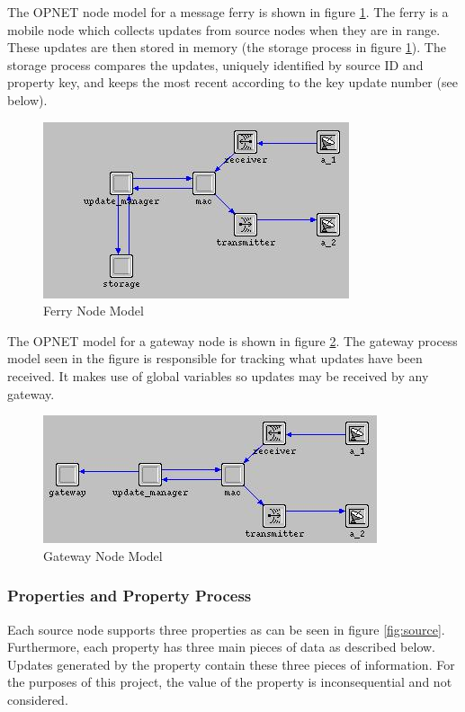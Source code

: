 The OPNET node model for a message ferry is shown in figure \ref{fig:Ferry}.
The ferry is a mobile node which collects updates from source nodes when they are in range. 
These updates are then stored in memory (the storage process in figure \ref{fig:Ferry}). 
The storage process compares the updates, uniquely identified by source ID and property key, and keeps the most recent according to the key update number (see below).

\begin{figure}[h]
    \centering
    \includegraphics[width=.7\textwidth]{images/ferry.jpg}
    \caption{Ferry Node Model}
    \label{fig:Ferry}
\end{figure}

The OPNET model for a gateway node is shown in figure \ref{fig:Gateway}. 
The gateway process model seen in the figure is responsible for tracking what updates have been received.
It makes use of global variables so updates may be received by any gateway.

\begin{figure}[h]
    \centering
    \includegraphics[width=.7\textwidth]{images/gateway.jpg}
    \caption{Gateway Node Model}
    \label{fig:Gateway}
\end{figure}

\subsubsection{Properties and Property Process}

Each source node supports three properties as can be seen in figure \ref {fig:source}.
Furthermore, each property has three main pieces of data as described below. 
Updates generated by the property contain these three pieces of information.
For the purposes of this project, the value of the property is inconsequential and not considered.

